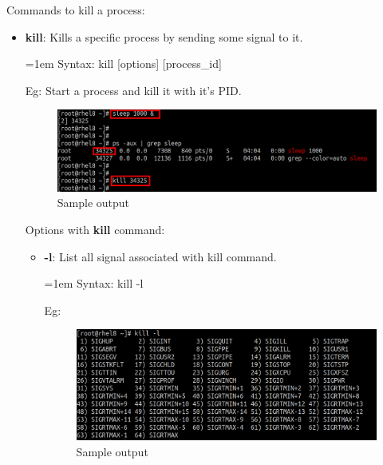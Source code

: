 \setlength{\columnsep}{3pt}
\begin{flushleft}
	Commands to kill a process:
	\begin{itemize}
		\item \textbf{kill}: Kills a specific process by sending some signal to it.
		\begin{tcolorbox}[breakable,notitle,boxrule=-0pt,colback=pink,colframe=pink]
			\color{black}
			\font=1em
			Syntax: kill [options] [process\_id]
			\font=4pt
		\end{tcolorbox}
		Eg: Start a process and kill it with it's PID.
			\begin{figure}[h!]
				\centering
				\includegraphics[scale=.3]{content/chapter12/images/kill1.png}
				\caption{Sample output}
				\label{fig:process23482}
			\end{figure}

		
		Options with \textbf{kill} command:	
		\begin{itemize}
			
			\item \textbf{-l}: List all signal associated with kill command.			
			\begin{tcolorbox}[breakable,notitle,boxrule=-0pt,colback=pink,colframe=pink]
				\color{black}
				\font=1em
				Syntax: kill -l
				\font=4pt
			\end{tcolorbox}
			Eg: 
			\begin{figure}[h!]
				\centering
				\includegraphics[scale=.3]{content/chapter12/images/kill2.png}
				\caption{Sample output}
				\label{fig:process2347}
			\end{figure}
			\newpage


\end{itemize}
\end{itemize}
\end{flushleft}
